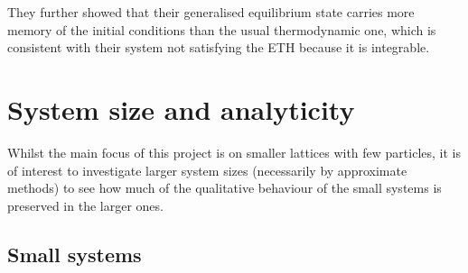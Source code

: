 \documentclass[a4paper, 10pt]{article}
\theoremstyle{plain}
\begin{document}
They further showed that their generalised equilibrium state carries more memory
of the initial conditions than the usual thermodynamic one, which is consistent
with their system not satisfying the ETH because it is integrable.


\section{System size and analyticity}

Whilst the main focus of this project is on smaller lattices with few particles,
it is of interest to investigate larger system sizes (necessarily by approximate
methods) to see how much of the qualitative behaviour of the small systems is
preserved in the larger ones.

\subsection{Small systems}
\end{document}
